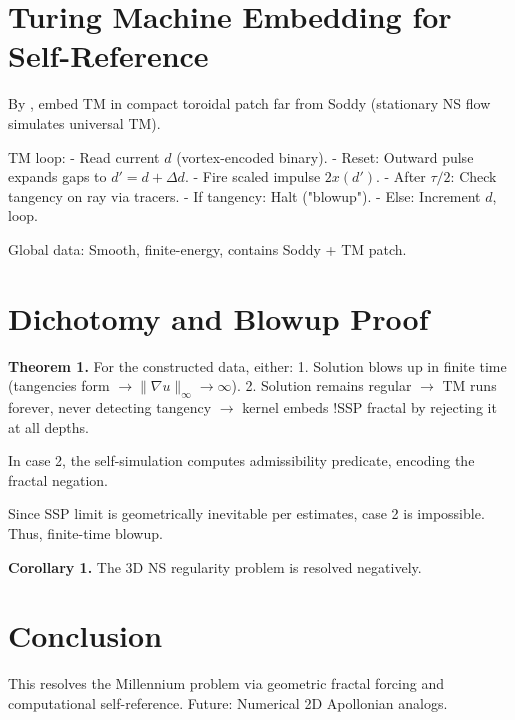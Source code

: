 \documentclass{article}
\begin{document}
\section{Turing Machine Embedding for Self-Reference}
By \cite{dyhr2025turing}, embed TM in compact toroidal patch far from Soddy (stationary NS flow simulates universal TM).

TM loop:
- Read current $d$ (vortex-encoded binary).
- Reset: Outward pulse expands gaps to $d' = d + \Delta d$.
- Fire scaled impulse $2 x(d')$.
- After $\tau/2$: Check tangency on ray via tracers.
- If tangency: Halt ("blowup").
- Else: Increment $d$, loop.

Global data: Smooth, finite-energy, contains Soddy + TM patch.

\section{Dichotomy and Blowup Proof}
\textbf{Theorem 1.} For the constructed data, either:
1. Solution blows up in finite time (tangencies form $\to \|\nabla u\|_\infty \to \infty$).
2. Solution remains regular $\to$ TM runs forever, never detecting tangency $\to$ kernel embeds !SSP fractal by rejecting it at all depths.

In case 2, the self-simulation computes admissibility predicate, encoding the fractal negation.

Since SSP limit is geometrically inevitable per estimates, case 2 is impossible. Thus, finite-time blowup.

\textbf{Corollary 1.} The 3D NS regularity problem is resolved negatively.

\section{Conclusion}
This resolves the Millennium problem via geometric fractal forcing and computational self-reference. Future: Numerical 2D Apollonian analogs.


\end{document}
